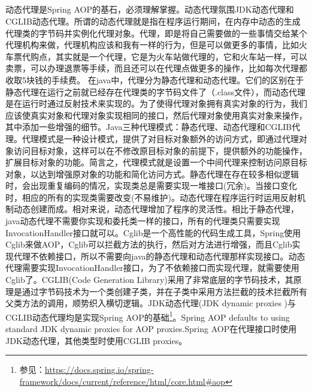 \documentclass[../../../interview-questions.tex]{subfiles}
\begin{document}
\subsection{\color{red}{Java的静态代理(Static Proxy)和动态代理(Dynamic Proxy)有什么差别？}}

动态代理是Spring AOP的基石，必须理解掌握。动态代理氛围JDK动态代理和CGLIB动态代理。所谓的动态代理就是指在程序运行期间，在内存中动态的生成代理类的字节码并实例化代理对象。代理，即是将自己需要做的一些事情交给某个代理机构来做，代理机构应该和我有一样的行为，但是可以做更多的事情，比如火车票代购点，其实就是一个代理，它是为火车站做代理的，它和火车站一样，可以卖票，可以办理退票等手续，而且还可以在代理点做更多的操作，比如每次代理都收取5块钱的手续费。
在java中，代理分为静态代理和动态代理。它们的区别在于静态代理在运行之前就已经存在代理类的字节码文件了（.class文件），而动态代理是在运行时通过反射技术来实现的。为了使得代理对象拥有真实对象的行为，我们应该使真实对象和代理对象实现相同的接口，然后代理对象使用真实对象来操作，其中添加一些增强的细节。Java三种代理模式：静态代理、动态代理和CGLIB代理。代理模式是一种设计模式，提供了对目标对象额外的访问方式，即通过代理对象访问目标对象，这样可以在不修改原目标对象的前提下，提供额外的功能操作，扩展目标对象的功能。简言之，代理模式就是设置一个中间代理来控制访问原目标对象，以达到增强原对象的功能和简化访问方式。静态代理在存在较多相似逻辑时，会出现重复编码的情况，实现类总是需要实现一堆接口(冗余)。当接口变化时，相应的所有的实现类需要改变(不易维护)。动态代理在程序运行时运用反射机制动态创建而成。相对来说，动态代理增加了程序的灵活性。相比于静态代理，java动态代理不需要你实现和委托类一样的接口，所有的代理类只需要实现InvocationHandler接口就可以。Cglib是一个高性能的代码生成工具，Spring使用Cglib来做AOP，Cglib可以拦截方法的执行，然后对方法进行增强，而且Cglib实现代理不依赖接口，所以不需要向java的静态代理和动态代理那样实现接口。动态代理需要实现InvocationHandler接口，为了不依赖接口而实现代理，就需要使用Cglib了。CGLIB(Code Generation Library)采用了非常底层的字节码技术，其原理是通过字节码技术为一个类创建子类，并在子类中采用方法拦截的技术拦截所有父类方法的调用，顺势织入横切逻辑。JDK动态代理(JDK dynamic proxies )与CGLIB动态代理均是实现Spring AOP的基础\footnote{参见：\url{https://docs.spring.io/spring-framework/docs/current/reference/html/core.html\#aop}}。Spring AOP defaults to using standard JDK dynamic proxies for AOP proxies.Spring AOP在代理接口时使用JDK动态代理，其他类型时使用CGLIB proxies。
\end{document}

